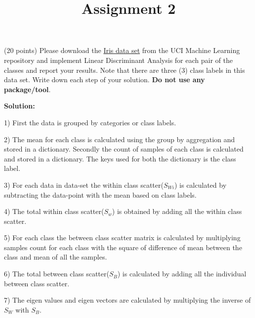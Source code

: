\documentclass{exam}
\title{Assignment 2}
\date{}
\begin{document}
\maketitle
\thispagestyle{headandfoot}

\begin{center}
  {}
\end{center}
\vspace{.5cm}
\begin{questions}

 (20 points) Please download the \href{https://archive.ics.uci.edu/ml/datasets/Iris}{Iris data set} from the UCI Machine Learning repository and implement Linear Discriminant Analysis for each pair of the classes and report your results. Note that there are three (3) class labels in this data set. Write down each step of your solution. \textbf{Do not use any package/tool}. 
\vspace{5em}

\textbf{Solution:}

1) First the data is grouped by categories or class labels.

2) The mean for each class is calculated using the group by aggregation and stored in a dictionary. Secondly the count of samples of each class is calculated and stored in a dictionary. The keys used for both the dictionary is the class label.

3) For each data in data-set the within class scatter($S_{Wi}$) is calculated by subtracting the data-point with the mean based on class labels.

4) The total within class scatter($S_{w}$) is obtained by adding all the within class scatter.

5) For each class the between class scatter matrix is calculated by multiplying samples count for each class with the square of difference of mean between the class and mean of all the samples.

6) The total  between class scatter($S_{B}$) is calculated by adding all the individual between class scatter.

7) The eigen values and eigen vectors are calculated by multiplying the inverse of $S_{W}$ with $S_{B}$.


\end{questions}
\end{document}
